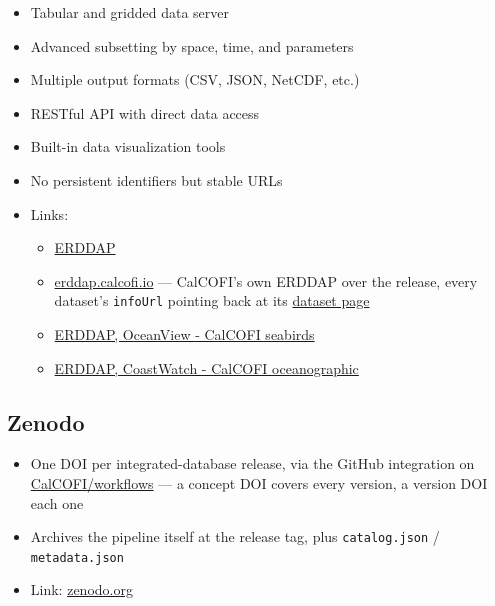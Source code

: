 \documentclass[
  letterpaper,
  DIV=11,
  numbers=noendperiod]{scrreprt}
\providecommand{\tightlist}{%
  \setlength{\itemsep}{0pt}\setlength{\parskip}{0pt}}
\begin{document}
\begin{itemize}
\tightlist
\item
  Tabular and gridded data server
\item
  Advanced subsetting by space, time, and parameters
\item
  Multiple output formats (CSV, JSON, NetCDF, etc.)
\item
  RESTful API with direct data access
\item
  Built-in data visualization tools
\item
  No persistent identifiers but stable URLs
\item
  Links:

  \begin{itemize}
  \tightlist
  \item
    \href{https://upwell.pfeg.noaa.gov/erddap/index.html}{ERDDAP}
  \item
    \href{https://erddap.calcofi.io/erddap/index.html}{erddap.calcofi.io}
    --- CalCOFI's own ERDDAP over the release, every dataset's
    \texttt{infoUrl} pointing back at its
    \href{https://calcofi.io/datasets/}{dataset page}
  \item
    \href{https://oceanview.pfeg.noaa.gov/erddap/search/index.html?page=1&itemsPerPage=1000&searchFor=seabird+CalCOFI}{ERDDAP,
    OceanView - CalCOFI seabirds}
  \item
    \href{https://coastwatch.pfeg.noaa.gov/erddap/search/index.html?page=1&itemsPerPage=1000&searchFor=CalCOFI}{ERDDAP,
    CoastWatch - CalCOFI oceanographic}
  \end{itemize}
\end{itemize}

\subsection{Zenodo}\label{zenodo}

\begin{itemize}
\tightlist
\item
  One DOI per integrated-database release, via the GitHub integration on
  \href{https://github.com/CalCOFI/workflows}{CalCOFI/workflows} --- a
  concept DOI covers every version, a version DOI each one
\item
  Archives the pipeline itself at the release tag, plus
  \texttt{catalog.json} / \texttt{metadata.json}
\item
  Link: \href{https://zenodo.org}{zenodo.org}
\end{itemize}
\end{document}
